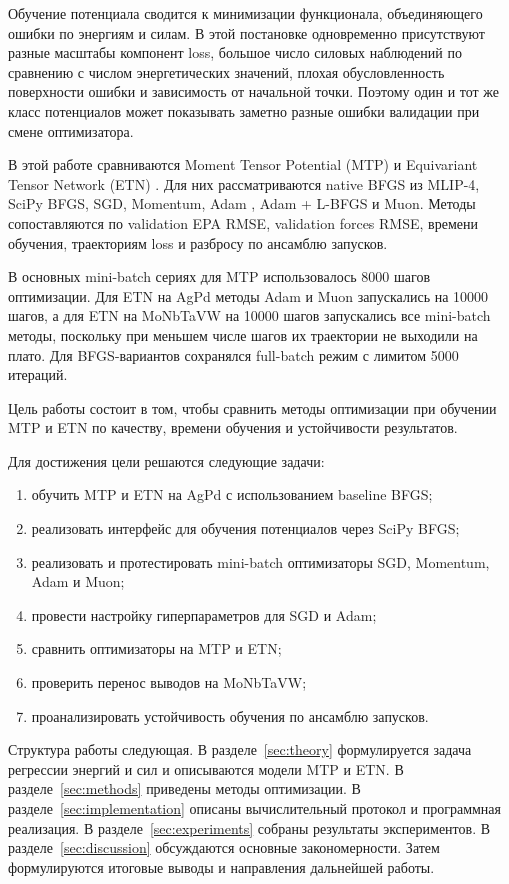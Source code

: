 \documentclass[a4paper,12pt]{extarticle}
\begin{document}
Обучение потенциала сводится к минимизации функционала, объединяющего ошибки по энергиям и силам. В этой постановке одновременно присутствуют разные масштабы компонент loss, большое число силовых наблюдений по сравнению с числом энергетических значений, плохая обусловленность поверхности ошибки и зависимость от начальной точки. Поэтому один и тот же класс потенциалов может показывать заметно разные ошибки валидации при смене оптимизатора.

В этой работе сравниваются Moment Tensor Potential (MTP) \cite{shapeev2016mtp,novikov2021mlip} и Equivariant Tensor Network (ETN) \cite{hodapp2025etn}. Для них рассматриваются native BFGS из MLIP-4, SciPy BFGS, SGD, Momentum, Adam \cite{kingma2015adam}, Adam + L-BFGS и Muon. Методы сопоставляются по validation EPA RMSE, validation forces RMSE, времени обучения, траекториям loss и разбросу по ансамблю запусков.

В основных mini-batch сериях для MTP использовалось 8000 шагов оптимизации. Для ETN на AgPd методы Adam и Muon запускались на 10000 шагов, а для ETN на MoNbTaVW на 10000 шагов запускались все mini-batch методы, поскольку при меньшем числе шагов их траектории не выходили на плато. Для BFGS-вариантов сохранялся full-batch режим с лимитом 5000 итераций.

Цель работы состоит в том, чтобы сравнить методы оптимизации при обучении MTP и ETN по качеству, времени обучения и устойчивости результатов.

Для достижения цели решаются следующие задачи:
\begin{enumerate}
    \item обучить MTP и ETN на AgPd с использованием baseline BFGS;
    \item реализовать интерфейс для обучения потенциалов через SciPy BFGS;
    \item реализовать и протестировать mini-batch оптимизаторы SGD, Momentum, Adam и Muon;
    \item провести настройку гиперпараметров для SGD и Adam;
    \item сравнить оптимизаторы на MTP и ETN;
    \item проверить перенос выводов на MoNbTaVW;
    \item проанализировать устойчивость обучения по ансамблю запусков.
\end{enumerate}

Структура работы следующая. В разделе~\ref{sec:theory} формулируется задача регрессии энергий и сил и описываются модели MTP и ETN. В разделе~\ref{sec:methods} приведены методы оптимизации. В разделе~\ref{sec:implementation} описаны вычислительный протокол и программная реализация. В разделе~\ref{sec:experiments} собраны результаты экспериментов. В разделе~\ref{sec:discussion} обсуждаются основные закономерности. Затем формулируются итоговые выводы и направления дальнейшей работы.
\end{document}
